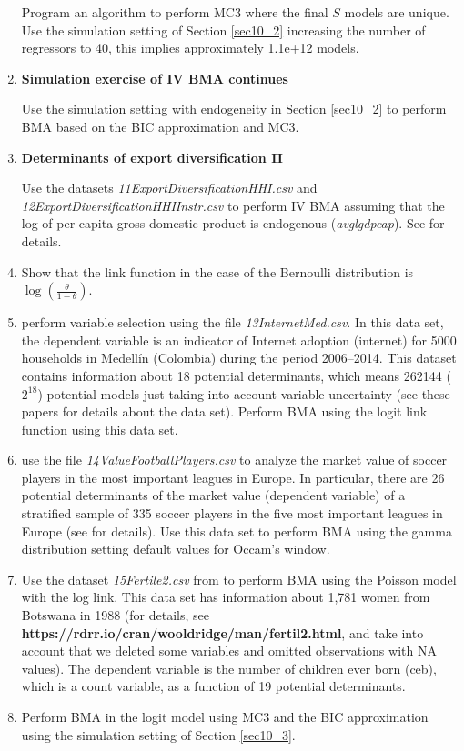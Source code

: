 \begin{enumerate}
Program an algorithm to perform MC3 where the final $S$ models are unique. Use the simulation setting of Section \ref{sec10_2} increasing the number of regressors to 40, this implies approximately 1.1e+12 models.

\item \textbf{Simulation exercise of IV BMA continues}

Use the simulation setting with endogeneity in Section \ref{sec10_2} to perform BMA based on the BIC approximation and MC3.

\item \textbf{Determinants of export diversification II}

Use the datasets \textit{11ExportDiversificationHHI.csv} and \textit{12ExportDiversificationHHIInstr.csv} to perform IV BMA assuming that the log of per capita gross domestic product is endogenous (\textit{avglgdpcap}). See \cite{Jetter2015} for details.

\item Show that the link function in the case of the Bernoulli distribution is $\log\left(\frac{\theta}{1-\theta}\right)$.

\item \cite{ramirez2020dynamic,ramirez2021specification} perform variable selection using the file \textit{13InternetMed.csv}. In this data set, the dependent variable is an indicator of Internet adoption (internet) for 5000 households in Medell\'in (Colombia) during the period 2006--2014. This dataset contains information about 18 potential determinants, which means 262144 ($2^{18}$) potential models just taking into account variable uncertainty (see these papers for details about the data set). Perform BMA using the logit link function using this data set.  

\item \cite{Serna2018} use the file \textit{14ValueFootballPlayers.csv} to analyze the market value of soccer players in the most important leagues in Europe. In particular, there are 26 potential determinants of the market value (dependent variable) of a stratified sample of 335 soccer players in the five most important leagues in Europe (see \cite{Serna2018} for details). Use this data set to perform BMA using the gamma distribution setting default values for Occam's window.  

\item Use the dataset \textit{15Fertile2.csv} from \cite[p.~547]{Wooldridge2012} to perform BMA using the Poisson model with the log link. This data set has information about 1,781 women from Botswana in 1988 (for details, see \textbf{https://rdrr.io/cran/wooldridge/man/fertil2.html}, and take into account that we deleted some variables and omitted observations with NA values). The dependent variable is the number of children ever born (ceb), which is a count variable, as a function of 19 potential determinants.

\item Perform BMA in the logit model using MC3 and the BIC approximation using the simulation setting of Section \ref{sec10_3}.        
	
\end{enumerate}